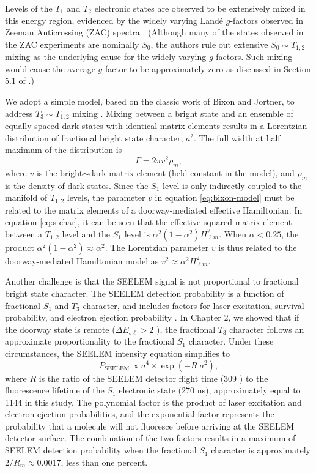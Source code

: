 Levels of the $T_1$ and $T_2$ electronic states are observed to be
extensively mixed in this energy region, evidenced by the widely
varying Land\'{e} $g$-factors observed in Zeeman Anticrossing (ZAC)
spectra \cite{dupre95a}.  (Although many of the states observed in the
ZAC experiments are nominally $S_0$, the authors rule out extensive
$S_0 \sim T_{1,2}$ mixing as the underlying cause for the widely
varying $g$-factors.  Such mixing would cause the average $g$-factor
to be approximately zero as discussed in Section 5.1 of
\cite{dupre95a}.)

We adopt a simple model, based on the classic work of Bixon and
Jortner, to address $T_3 \sim T_{1,2}$ mixing \cite{bixon68}.  Mixing
between a bright state and an ensemble of equally spaced dark states
with identical matrix elements results in a Lorentzian distribution of
fractional bright state character, $a^2$.  The full width at half
maximum of the distribution is
\begin{equation}
  \label{eq:bixon-model}
  \Gamma = 2 \pi v^2 \rho_m,
\end{equation}
where $v$ is the bright$\sim$dark matrix element (held constant in the
model), and $\rho_m$ is the density of dark states.  Since the $S_1$
level is only indirectly coupled to the manifold of $T_{1,2}$ levels,
the parameter $v$ in equation \ref{eq:bixon-model} must be related to
the matrix elements of a doorway-mediated effective Hamiltonian.  In
equation \ref{eq:s-char}, it can be seen that the effective squared
matrix element between a $T_{1,2}$ level and the $S_1$ level is
$\alpha^2 (1 - \alpha^2) H_{\ell m}^2$.  When $\alpha < 0.25$, the
product $\alpha^2 (1 - \alpha^2) \approx \alpha^2$.  The Lorentzian
parameter $v$ is thus related to the doorway-mediated Hamiltonian
model as $v^2 \approx \alpha^2 H_{\ell m}^2$.

Another challenge is that the SEELEM signal is not proportional to
fractional bright state character.  The SEELEM detection probability
is a function of fractional $S_1$ and $T_3$ character, and includes
factors for laser excitation, survival probability, and electron
ejection probability \cite{humphrey97}.  In Chapter 2, we showed that
if the doorway state is remote ($\Delta E_{s\ell} > 2$ \rcm), the
fractional $T_3$ character follows an approximate proportionality to
the fractional $S_1$ character.  Under these circumstances, the SEELEM
intensity equation simplifies to
\begin{equation}
  \label{eq:simple-lem}
  P_{\text{SEELEM}} \propto a^4 \times \exp(-R \; a^2),
\end{equation}
where $R$ is the ratio of the SEELEM detector flight time (309
\microsec) to the fluorescence lifetime of the $S_1$ electronic state
(270 ns), approximately equal to 1144 in this study.  The polynomial
factor is the product of laser excitation and electron ejection
probabilities, and the exponential factor represents the probability
that a molecule will not fluoresce before arriving at the SEELEM
detector surface.  The combination of the two factors results in a
maximum of SEELEM detection probability when the fractional $S_1$
character is approximately $2/R_m \approx 0.0017$, less than one
percent.  


